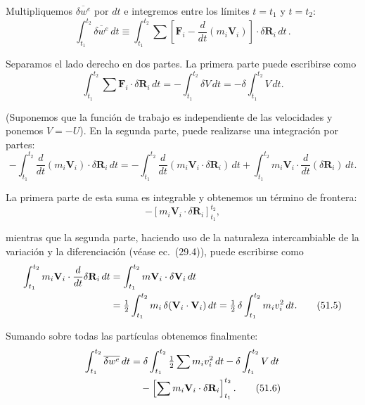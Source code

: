 \documentclass[12pt,a4paper]{book}
\newcommand{\vect}[1]{\mathbf{#1}}
\begin{document}

Multipliquemos $\overline{\delta w^e}$ por $dt$ e integremos entre los límites $t = t_1$ y $t = t_2$:
\begin{equation}
\int_{t_1}^{t_2} \overline{\delta w^e} \, dt \equiv \int_{t_1}^{t_2} \sum \left[ \vect{F}_i - \frac{d}{dt}(m_i \vect{V}_i) \right] \cdot \delta \vect{R}_i \, dt \,. \tag{51.1}
\end{equation}

Separamos el lado derecho en dos partes. La primera parte puede escribirse como
\begin{equation}
\int_{t_1}^{t_2} \sum \vect{F}_i \cdot \delta \vect{R}_i \, dt = - \int_{t_1}^{t_2} \delta V \, dt = - \delta \int_{t_1}^{t_2} V \, dt. \tag{51.2}
\end{equation}

(Suponemos que la función de trabajo es independiente de las velocidades y ponemos $V = -U$). En la segunda parte, puede realizarse una integración por partes:
\begin{equation}
- \int_{t_1}^{t_2} \frac{d}{dt}(m_i \vect{V}_i) \cdot \delta \vect{R}_i \, dt = - \int_{t_1}^{t_2} \frac{d}{dt}(m_i \vect{V}_i \cdot \delta \vect{R}_i) \, dt + \int_{t_1}^{t_2} m_i \vect{V}_i \cdot \frac{d}{dt}(\delta \vect{R}_i) \, dt. \tag{51.3}
\end{equation}

La primera parte de esta suma es integrable y obtenemos un término de frontera:
\begin{equation}
- \left[ m_i \vect{V}_i \cdot \delta \vect{R}_i \right]_{t_1}^{t_2}, \tag{51.4}
\end{equation}

mientras que la segunda parte, haciendo uso de la naturaleza intercambiable de la variación y la diferenciación (véase ec.\ (29.4)), puede escribirse como
\begin{align}
\int_{t_1}^{t_2} m_i \vect{V}_i \cdot \frac{d}{dt} \delta \vect{R}_i \, dt &= \int_{t_1}^{t_2} m \vect{V}_i \cdot \delta \vect{V}_i \, dt \notag \\
&= \tfrac{1}{2} \int_{t_1}^{t_2} m_i \, \delta(\vect{V}_i \cdot \vect{V}_i) \, dt = \tfrac{1}{2} \, \delta \int_{t_1}^{t_2} m_i v_i^2 \, dt. \tag{51.5}
\end{align}

Sumando sobre todas las partículas obtenemos finalmente:
\begin{align}
\int_{t_1}^{t_2} \overline{\delta w^e} \, dt &= \delta \int_{t_1}^{t_2} \tfrac{1}{2} \sum m_i v_i^2 \, dt - \delta \int_{t_1}^{t_2} V \, dt \notag \\
&\quad - \left[ \sum m_i \vect{V}_i \cdot \delta \vect{R}_i \right]_{t_1}^{t_2}. \tag{51.6}
\end{align}
\end{document}
